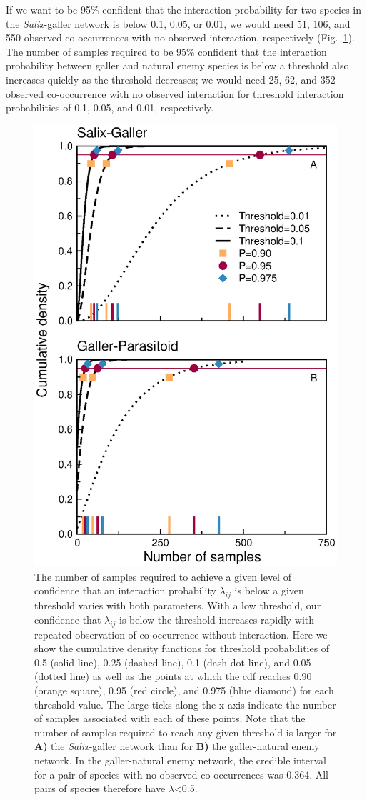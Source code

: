 \documentclass[12pt]{article}
\begin{document}
      If we want to be 95\% confident that the interaction probability for two species in the \emph{Salix}-galler network is below 0.1, 0.05, or 0.01, we would need 51, 106, and 550 observed co-occurrences with no observed interaction, respectively (Fig.~\ref{Salix_cdfs}). The number of samples required to be 95\% confident that the interaction probability between galler and natural enemy species is below a threshold also increases quickly as the threshold decreases; we would need 25, 62, and 352 observed co-occurrence with no observed interaction for threshold interaction probabilities of 0.1, 0.05, and 0.01, respectively. 


      \begin{figure}[h!]
        \caption{The number of samples required to achieve a given level of confidence that an interaction probability $\lambda_{ij}$ is below a given threshold varies with both parameters. With a low threshold, our confidence that $\lambda_{ij}$ is below the threshold increases rapidly with repeated observation of co-occurrence without interaction. Here we show the cumulative density functions for threshold probabilities of 0.5 (solid line), 0.25 (dashed line), 0.1 (dash-dot line), and 0.05 (dotted line) as well as the points at which the cdf reaches 0.90 (orange square), 0.95 (red circle), and 0.975 (blue diamond) for each threshold value. The large ticks along the x-axis indicate the number of samples associated with each of these points. Note that the number of samples required to reach any given threshold is larger for \textbf{A)} the \emph{Salix}-galler network than for \textbf{B)} the galler-natural enemy network. In the galler-natural enemy network, the credible interval for a pair of species with no observed co-occurrences was 0.364. All pairs of species therefore have $\lambda$\textless0.5.}
        \label{Salix_cdfs}
        \begin{center}
        \includegraphics[width=.6\textwidth]{figures/Salix_Galler_samples_and_cdfs.eps}
        \end{center}
        \end{figure}
\end{document}
